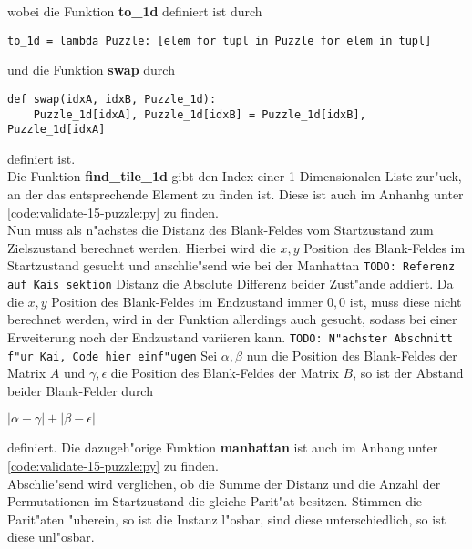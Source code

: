 wobei die Funktion \textbf{to\_1d} definiert ist durch
\vspace{.25cm}
\begin{verbatim}
to_1d = lambda Puzzle: [elem for tupl in Puzzle for elem in tupl]
\end{verbatim}
\vspace{.25cm}
und die Funktion \textbf{swap} durch
\vspace{.25cm}
\begin{verbatim}
def swap(idxA, idxB, Puzzle_1d):
    Puzzle_1d[idxA], Puzzle_1d[idxB] = Puzzle_1d[idxB], Puzzle_1d[idxA]
\end{verbatim}
\vspace{.25cm}
definiert ist.\\
Die Funktion \textbf{find\_tile\_1d} gibt den Index einer 1-Dimensionalen Liste zur"uck, an der das entsprechende Element zu finden ist. Diese ist auch im Anhanhg unter \ref{code:validate-15-puzzle:py} zu finden.\\
Nun muss als n"achstes die Distanz des Blank-Feldes vom Startzustand zum Zielszustand berechnet werden. Hierbei wird die $x,y$ Position des Blank-Feldes im Startzustand gesucht und anschlie"send wie bei der Manhattan \texttt{TODO: Referenz auf Kais sektion} Distanz die Absolute Differenz beider Zust"ande addiert. Da die $x,y$ Position des Blank-Feldes im Endzustand immer $0,0$ ist, muss diese nicht berechnet werden, wird in der Funktion allerdings auch gesucht, sodass bei einer Erweiterung noch der Endzustand variieren kann.
\texttt{TODO: N"achster Abschnitt f"ur Kai, Code hier einf"ugen}
Sei $\alpha,\beta$ nun die Position des Blank-Feldes der Matrix $A$ und $\gamma,\epsilon$ die Position des Blank-Feldes der Matrix $B$, so ist der Abstand beider Blank-Felder durch \\
\begin{center}
    $\left | \alpha - \gamma \right | + \left | \beta - \epsilon \right |$
\end{center}
definiert.
Die dazugeh"orige Funktion \textbf{manhattan} ist auch im Anhang unter \ref{code:validate-15-puzzle:py} zu finden.\\
Abschlie"send wird verglichen, ob die Summe der Distanz und die Anzahl der Permutationen im Startzustand die gleiche Parit"at besitzen. Stimmen die Parit"aten "uberein, so ist die Instanz l"osbar, sind diese unterschiedlich, so ist diese unl"osbar.


